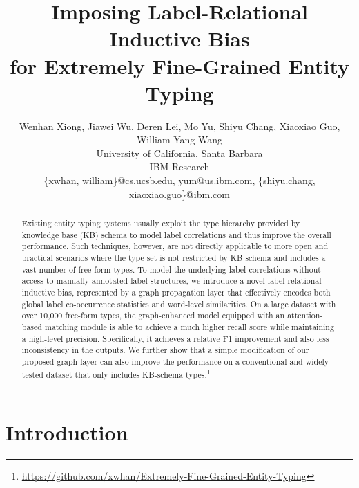 \documentclass[11pt,a4paper]{article}
\title{Imposing Label-Relational Inductive Bias\\ for Extremely Fine-Grained Entity Typing}
\author{
 Wenhan Xiong,
 Jiawei Wu,
 Deren Lei,
 Mo Yu, 
 Shiyu Chang, 
 Xiaoxiao Guo, 
 William Yang Wang
\\ 
  University of California, Santa Barbara\\
  IBM Research\\
\{xwhan, william\}@cs.ucsb.edu, yum@us.ibm.com, \{shiyu.chang, xiaoxiao.guo\}@ibm.com  
 }
\date{}
\begin{document}
\maketitle
\begin{abstract}




Existing entity typing systems usually exploit the type hierarchy provided by knowledge base (KB) schema to model label correlations and thus improve the overall performance.   Such techniques, however, are not directly applicable to more open and practical scenarios where the type set is not restricted by KB schema and includes a vast number of free-form types. To model the underlying label correlations without access to manually annotated label structures, we introduce a novel label-relational inductive bias, represented by a graph propagation layer that effectively encodes both global label co-occurrence statistics and word-level similarities. On a large dataset with over 10,000 free-form types, the graph-enhanced model equipped with an attention-based matching module is able to achieve a much higher recall score while maintaining a high-level precision.  Specifically, it achieves a  relative F1 improvement and also less inconsistency in the outputs.  We further show that a simple modification of our proposed graph layer can also improve the performance on a conventional and widely-tested dataset that only includes KB-schema types.\footnote{\url{https://github.com/xwhan/Extremely-Fine-Grained-Entity-Typing}}

\end{abstract}


\section{Introduction}
\end{document}
